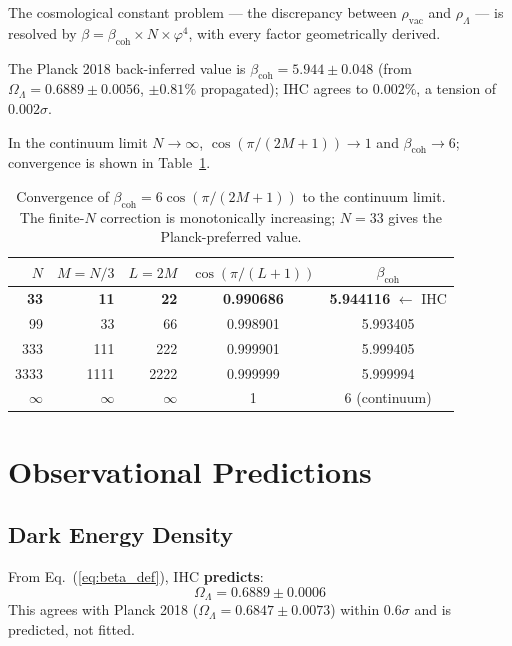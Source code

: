 \documentclass[12pt,a4paper]{article}
\begin{document}
The cosmological constant problem --- the discrepancy between $\rho_\mathrm{vac}$
and $\rho_\Lambda$ --- is resolved by $\beta = \beta_\mathrm{coh} \times N \times
\varphi^4$, with every factor geometrically derived.

The Planck 2018 back-inferred value is $\beta_\mathrm{coh} = 5.944\pm0.048$
(from $\Omega_\Lambda = 0.6889\pm0.0056$, $\pm0.81\%$ propagated); IHC agrees
to $0.002\%$, a tension of $0.002\sigma$.

In the continuum limit $N\to\infty$, $\cos(\pi/(2M+1))\to 1$ and
$\beta_\mathrm{coh}\to 6$; convergence is shown in Table~\ref{tab:bcoh_continuum}.

\begin{table}[htbp]
\centering
\caption{Convergence of $\beta_\mathrm{coh} = 6\cos(\pi/(2M+1))$ to the
continuum limit. The finite-$N$ correction is monotonically increasing;
$N=33$ gives the Planck-preferred value.}
\label{tab:bcoh_continuum}
\small
\begin{tabular}{rrrcc}
\toprule
$N$ & $M=N/3$ & $L=2M$ & $\cos(\pi/(L+1))$ & $\beta_\mathrm{coh}$ \\
\midrule
\textbf{33}   & \textbf{11}   & \textbf{22}   & \textbf{0.990686} & \textbf{5.944116} $\leftarrow$ IHC \\
99            & 33            & 66            & 0.998901          & 5.993405 \\
333           & 111           & 222           & 0.999901          & 5.999405 \\
3333          & 1111          & 2222          & 0.999999          & 5.999994 \\
$\infty$      & $\infty$      & $\infty$      & 1                 & 6 (continuum) \\
\bottomrule
\end{tabular}
\end{table}

\section{Observational Predictions}

\subsection{Dark Energy Density}

From Eq.~(\ref{eq:beta_def}), IHC \textbf{predicts}:
\begin{equation}
  \Omega_\Lambda = 0.6889 \pm 0.0006
\end{equation}
This agrees with Planck 2018 ($\Omega_\Lambda = 0.6847 \pm 0.0073$)
\citep{Planck2020} within $0.6\sigma$ and is predicted, not fitted.
\end{document}
